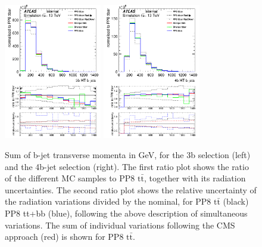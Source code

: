 \begin{figure}[!htb]
\centering
\includegraphics[width=0.38\textwidth]{Plots/ttbb/hisgenHTbjets_4j3t__div}
\includegraphics[width=0.38\textwidth]{Plots/ttbb/hisgenHTbjets_4j4t__div}
  \caption{Sum of b-jet transverse momenta in GeV, for the 3b selection (left) and the 4b-jet selection (right). The first ratio plot shows the ratio of the different MC samples to PP8 $\mathrm{t\bar{t}}$, together with its radiation uncertainties. The second ratio plot shows the relative uncertainty of the radiation variations divided by the nominal, for PP8 $\mathrm{t\bar{t}}$ (black) PP8 tt+bb (blue), following the above description of simultaneous variations. The sum of individual variations following the CMS approach (red) is shown for PP8 $\mathrm{t\bar{t}}$. \label{ttbb:HTbjets}}
\end{figure}

